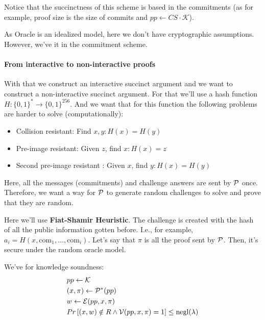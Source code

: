   Notice that the succinctness of this scheme is based in the commitments (as for example, 
  proof size is the size of commits and $pp \leftarrow CS \cdot \mathcal{K}$).

  As Oracle is an idealized model, here we don't have cryptographic assumptions.
  However, we've it in the commitment scheme.

  \paragraph{From interactive to non-interactive proofs}
  With that we construct an interactive succinct argument and we want to construct a non-interactive 
  succinct argument.
  For that we'll use a hash function $H : \{0,1\}^* \to \{0,1\}^{256}$.
  And we want that for this function the following problems are harder to solve (computationally):
  \begin{itemize}
    \item Collision resistant: Find $x,y : H(x) = H(y)$
    \item Pre-image resistant: Given $z$, find $x : H(x) = z$
    \item Second pre-image resistant : Given $x$, find $y : H(x) = H(y)$
  \end{itemize}

  Here, all the messages (commitments) and challenge answers are sent by $\mathcal{P}$ once.
  Therefore, we want a way for $\mathcal{P}$ to generate random challenges to solve and prove that 
  they are random.

  Here we'll use \textbf{Fiat-Shamir Heuristic}.
  The challenge is created with the hash of all the public information gotten before.
  I.e., for example, $a_i = H(x,\text{com}_1,\dots,\text{com}_i)$.
  Let's say that $\pi$ is all the proof sent by $\mathcal{P}$.
  Then, it's secure under the random oracle model.

  We've for knowledge soundness:
  \begin{equation*}
    \begin{aligned}
      &pp \leftarrow \mathcal{K} \\ 
      &(x,\pi) \leftarrow \mathcal{P}^*(pp) \\ 
      &w \leftarrow \mathcal{E}(pp, x, \pi) \\
      &Pr\left[(x,w) \notin R \land \mathcal{V}(pp,x,\pi) = 1\right] \leq \text{negl}(\lambda)
    \end{aligned}
  \end{equation*}

